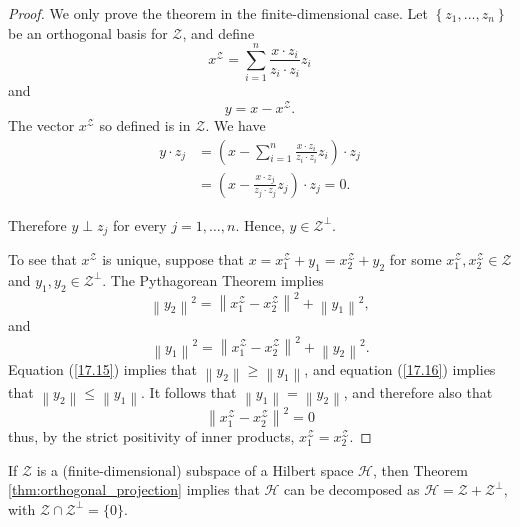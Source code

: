 \documentclass[\topdir/lecture\_notes.tex]{subfiles}
\begin{document}
\begin{proof}
We only prove the theorem in the finite-dimensional case. Let \(\left\{z_{1}, \ldots, z_{n}\right\}\) be an orthogonal basis for \(\mathcal{Z}\), and define
\begin{equation}
x^{\mathcal{Z}}=\sum_{i=1}^{n} \frac{x \cdot z_{i}}{z_{i} \cdot z_{i}} z_{i} \label{17.11}
\end{equation}
and
\begin{equation*}
y=x-x^{\mathcal{Z}}. 
\end{equation*}
The vector \(x^{\mathcal{Z}}\) so defined is in \(\mathcal{Z}\). We have
\begin{align}
y \cdot z_{j} & =\left(x-\sum_{i=1}^{n} \frac{x \cdot z_{i}}{z_{i} \cdot z_{i}} z_{i}\right) \cdot z_{j} \\
& =\left(x-\frac{x \cdot z_{j}}{z_{j} \cdot z_{j}} z_{j}\right) \cdot z_{j}=0. 
\end{align}

Therefore \(y \perp z_{j}\) for every \(j=1, \ldots, n\). Hence, \(y \in \mathcal{Z}^{\perp}\).

To see that \(x^{\mathcal{Z}}\) is unique, suppose that \(x=x_{1}^{\mathcal{Z}}+y_{1}=x_{2}^{\mathcal{Z}}+y_{2}\) for some \(x_{1}^{\mathcal{Z}}, x_{2}^{\mathcal{Z}} \in \mathcal{Z}\) and \(y_{1}, y_{2} \in \mathcal{Z}^{\perp}\). The Pythagorean Theorem implies
\begin{equation}
\left\|y_{2}\right\|^{2}=\left\|x_{1}^{\mathcal{Z}}-x_{2}^{\mathcal{Z}}\right\|^{2}+\left\|y_{1}\right\|^{2}, \label{17.15}
\end{equation}
and
\begin{equation}
\left\|y_{1}\right\|^{2}=\left\|x_{1}^{\mathcal{Z}}-x_{2}^{\mathcal{Z}}\right\|^{2}+\left\|y_{2}\right\|^{2} . \label{17.16}
\end{equation}
Equation (\ref{17.15}) implies that \(\left\|y_{2}\right\| \geq\left\|y_{1}\right\|\), and equation (\ref{17.16}) implies that \(\left\|y_{2}\right\| \leq\left\|y_{1}\right\|\). It follows that \(\left\|y_{1}\right\|=\left\|y_{2}\right\|\), and therefore also that
\begin{equation*}
\left\|x_{1}^{\mathcal{Z}}-x_{2}^{\mathcal{Z}}\right\|^{2}=0 
\end{equation*}
thus, by the strict positivity of inner products, \(x_{1}^{\mathcal{Z}}=x_{2}^{\mathcal{Z}}\).
\end{proof}

If \(\mathcal{Z}\) is a (finite-dimensional) subspace of a Hilbert space \(\mathcal{H}\), then Theorem \ref{thm:orthogonal_projection} implies that \(\mathcal{H}\) can be decomposed as \(\mathcal{H}=\mathcal{Z}+\mathcal{Z}^{\perp}\), with \(\mathcal{Z} \cap \mathcal{Z}^{\perp}=\{0\}\).
\end{document}
